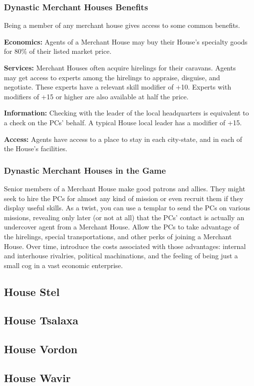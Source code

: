 \subsubsection{Dynastic Merchant Houses Benefits}
Being a member of any merchant house gives access to some common benefits.

\textbf{Economics:} Agents of a Merchant House may buy their House's specialty goods for 80\% of their listed market price.

\textbf{Services:} Merchant Houses often acquire hirelings for their caravans. Agents may get access to experts among the hirelings to appraise, disguise, and negotiate. These experts have a relevant skill modifier of +10. Experts with modifiers of +15 or higher are also available at half the price.

\textbf{Information:} Checking with the leader of the local headquarters is equivalent to a  check on the PCs' behalf. A typical House local leader has a  modifier of +15.

\textbf{Access:} Agents have access to a place to stay in each city-state, and in each of the House's facilities.

\subsubsection{Dynastic Merchant Houses in the Game}
Senior members of a Merchant House make good patrons and allies. They might seek to hire the PCs for almost any kind of mission or even recruit them if they display useful skills. As a twist, you can use a templar to send the PCs on various missions, revealing only later (or not at all) that the PCs' contact is actually an undercover agent from a Merchant House. Allow the PCs to take advantage of the hirelings, special transportations, and other perks of joining a Merchant House. Over time, introduce the costs associated with those advantages: internal and interhouse rivalries, political machinations, and the feeling of being just a small cog in a vast economic enterprise.





\subsection{House Stel}
\subsection{House Tsalaxa}
\subsection{House Vordon}
\subsection{House Wavir}
